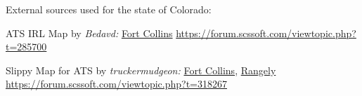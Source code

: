 














\vspace{2em}\footnoterule
{\footnotesize \noindent External sources used for the state of Colorado:
\begin{description}[
	style=nextline,
	leftmargin=1.1em,
	labelsep=0pt,
	parsep=0pt,
	font=\normalfont,
]

\item[$\ast$]
ATS IRL Map by \textit{Bedavd:}
\hyperref[city:Fort Collins]{Fort Collins}
\url{https://forum.scssoft.com/viewtopic.php?t=285700}

\item[$\dagger$]
Slippy Map for ATS by \textit{truckermudgeon:}
\hyperref[city:Fort Collins]{Fort Collins},
\hyperref[city:Rangely]{Rangely}
\url{https://forum.scssoft.com/viewtopic.php?t=318267}

\end{description}
}
